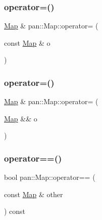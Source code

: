 \mbox{\label{classpan_1_1_map_af9d36a347d38a376d5da72bf85e95f68}} 
\subsubsection{\texorpdfstring{operator=()}{operator=()}\hspace{0.1cm}{\footnotesize\ttfamily [1/2]}}
{\footnotesize\ttfamily \hyperlink{classpan_1_1_map}{Map} \& pan\+::\+Map\+::operator= (\begin{DoxyParamCaption}\item[{const \hyperlink{classpan_1_1_map}{Map} \&}]{o }\end{DoxyParamCaption})}

\mbox{\label{classpan_1_1_map_a3413513964774303b47161eb8ed922f8}} 
\subsubsection{\texorpdfstring{operator=()}{operator=()}\hspace{0.1cm}{\footnotesize\ttfamily [2/2]}}
{\footnotesize\ttfamily \hyperlink{classpan_1_1_map}{Map} \& pan\+::\+Map\+::operator= (\begin{DoxyParamCaption}\item[{\hyperlink{classpan_1_1_map}{Map} \&\&}]{o }\end{DoxyParamCaption})}

\mbox{\label{classpan_1_1_map_a7b06691976776c099e60890b15b4eb99}} 
\subsubsection{\texorpdfstring{operator==()}{operator==()}}
{\footnotesize\ttfamily bool pan\+::\+Map\+::operator== (\begin{DoxyParamCaption}\item[{const \hyperlink{classpan_1_1_map}{Map} \&}]{other }\end{DoxyParamCaption}) const}

